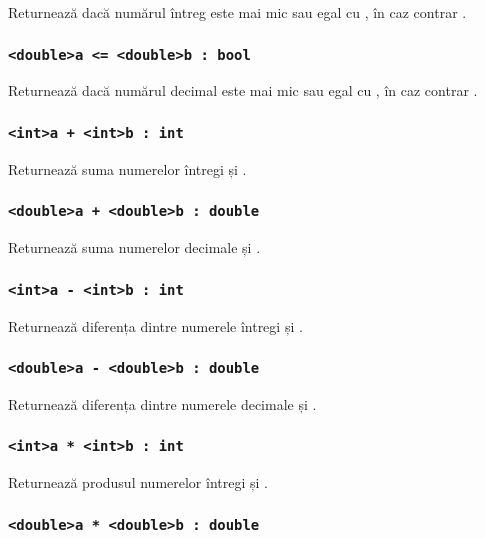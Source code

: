 Returnează \true{} dacă numărul întreg  este mai mic sau egal cu , în caz contrar \false{}.

\subsubsection{\lstinline|<double>a <= <double>b : bool|}

Returnează \true{} dacă numărul decimal  este mai mic sau egal cu , în caz contrar \false{}.

\subsubsection{\lstinline|<int>a + <int>b : int|}

Returnează suma numerelor întregi  și .

\subsubsection{\lstinline|<double>a + <double>b : double|}

Returnează suma numerelor decimale  și .

\subsubsection{\lstinline|<int>a - <int>b : int|}

Returnează diferența dintre numerele întregi  și .

\subsubsection{\lstinline|<double>a - <double>b : double|}

Returnează diferența dintre numerele decimale  și .

\subsubsection{\lstinline|<int>a * <int>b : int|}

Returnează produsul numerelor întregi  și .

\subsubsection{\lstinline|<double>a * <double>b : double|}

